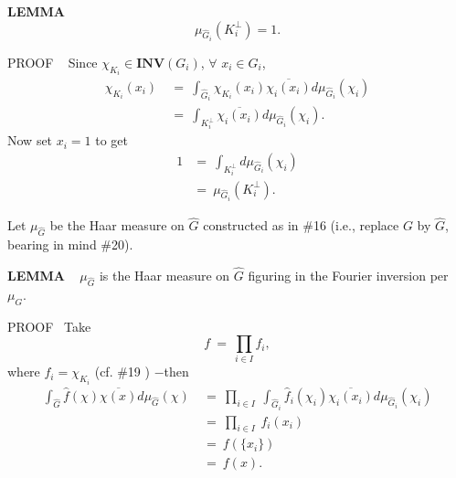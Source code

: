 \begin{x}{\small\bf LEMMA} \ %
\[
\mu_{\widehat{G}_i} (K_i^\perp) = 1.
\]

\vspace{0.1cm}

PROOF \ 
Since $\chi_{K_i} \in \mathbf{INV}(G_i)$, $\forall$ $x_i \in G_i$,
\begin{align*}
\chi_{K_i} (x_i) \ 
&= \  \int_{\widehat{G}_i } \widehat{\chi}_{K_i} (x_i) \overline{\chi_i (x_i)} d \mu_{\widehat{G}_i} (\chi_i) \\
&= \  \int_{K_i^\perp} \overline{\chi_i (x_i)} d \mu_{\widehat{G}_i} (\chi_i).
\end{align*}
Now set $x_i = 1$ to get
\begin{align*}
1 
&=\  \int_{K_i^\perp} d\mu_{\widehat{G}_i} (\chi_i) \\
&=\  \mu_{\widehat{G}_i}(K_i^\perp).
\end{align*}
\end{x}

\vspace{0.1cm}



Let $\mu_{\widehat{G}}$ be the Haar measure on $\widehat{G}$ constructed as in \#16  (i.e., replace $G$ by 
$\widehat{G}$, bearing in mind \#20).

\vspace{0.2cm}


\begin{x}{\small\bf LEMMA} \ %
$\mu_{\widehat{G}}$ is the Haar measure on $\widehat{G}$ figuring in the Fourier inversion per $\mu_G$.

\vspace{0.1cm}

PROOF \  Take
\[
f \ =\  \prod_{i \in I} f_i,
\]
where $f_i = \chi_{K_i}$ (cf. \#19 ) $-$then
\begin{align*}
\int_{\widehat{G}} \widehat{f}(\chi) \overline{\chi(x)} d\mu_{\widehat{G}} (\chi) \ 
&=\  \prod_{i \in I} \ \int_{\widehat{G}_i} \widehat{f}_i(\chi_i) \overline{\chi_i(x_i)} d\mu_{\widehat{G}_i} (\chi_i) \\	
&=\  \prod_{i \in I}\  f_i(x_i) \\	
&=\  f(\{x_i\}) \\
&=\  f(x).
\end{align*}
\end{x}





















